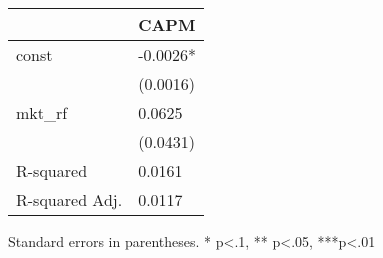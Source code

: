 \begin{table}
\caption{}
\label{}
\begin{center}
\begin{tabular}{ll}
\hline
               & CAPM      \\
\hline
const          & -0.0026*  \\
               & (0.0016)  \\
mkt\_rf        & 0.0625    \\
               & (0.0431)  \\
R-squared      & 0.0161    \\
R-squared Adj. & 0.0117    \\
\hline
\end{tabular}
\end{center}
\end{table}
\bigskip
Standard errors in parentheses. \newline 
* p<.1, ** p<.05, ***p<.01